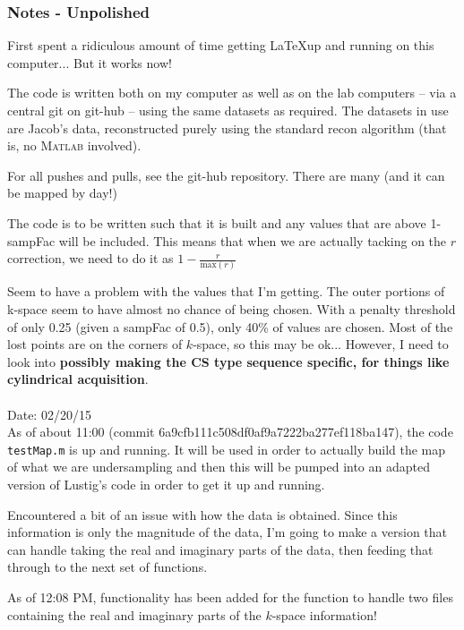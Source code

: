 \documentclass[11 pt]{article}
\newcommand{\matlab}{\textsc{Matlab }}
\begin{document}
    \subsubsection{Notes - Unpolished}
        First spent a ridiculous amount of time getting \LaTeX up and running on this computer... But it works now! 

        The code is written both on my computer as well as on the lab computers -- via a central git on git-hub -- using the same datasets as required. The datasets in use are Jacob's data, reconstructed purely using the standard recon algorithm (that is, no \matlab involved).

        For all pushes and pulls, see the git-hub repository. There are many (and it can be mapped by day!)

        The code is to be written such that it is built and any values that are above 1-sampFac will be included. This means that when we are actually tacking on the $r$ correction, we need to do it as $1-\frac{r}{\text{max}(r)}$

        Seem to have a problem with the values that I'm getting. The outer portions of k-space seem to have almost no chance of being chosen. With a penalty threshold of only 0.25 (given a sampFac of 0.5), only 40\% of values are chosen. Most of the lost points are on the corners of $k$-space, so this may be ok... However, I need to look into \textbf{possibly making the CS type sequence specific, for things like cylindrical acquisition}. \\ \\ 
      
        \noindent Date: 02/20/15 \\
        As of about 11:00 (commit 6a9cfb111c508df0af9a7222ba277ef118ba147), the code \verb!testMap.m! is up and running. It will be used in order to actually build the map of what we are undersampling and then this will be pumped into an adapted version of Lustig's code in order to get it up and running.

        Encountered a bit of an issue with how the data is obtained. Since this information is only the magnitude of the data, I'm going to make a version that can handle taking the real and imaginary parts of the data, then feeding that through to the next set of functions.

        As of 12:08 PM, functionality has been added for the function to handle two files containing the real and imaginary parts of the $k$-space information!
\end{document}

